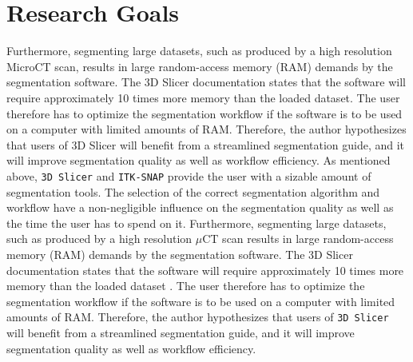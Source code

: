 \section{Research Goals}
\label{s:introduction-researchgoals}
Furthermore, segmenting large datasets, such as produced by a high resolution MicroCT scan, results in large random-access memory (RAM) demands by the segmentation software.
The 3D Slicer documentation states that the software will require approximately 10 times more memory than the loaded dataset.
The user therefore has to optimize the segmentation workflow if the software is to be used on a computer with limited amounts of RAM.
Therefore, the author hypothesizes that users of 3D Slicer will benefit from a streamlined segmentation guide, and it will improve segmentation quality as well as workflow efficiency.
As mentioned above, \texttt{3D Slicer} and \texttt{ITK-SNAP} provide the user with a sizable amount of segmentation tools. The selection of the correct segmentation algorithm and workflow have a non-negligible influence on the segmentation quality as well as the time the user has to spend on it\cite{liuSAMMSegmentAny2023}. Furthermore, segmenting large datasets, such as produced by a high resolution $\mu$CT scan results in large random-access memory (RAM) demands by the segmentation software\cite{smistadMedicalImageSegmentation2015}.
The 3D Slicer documentation states that the software will require approximately 10 times more memory than the loaded dataset \cite{slicercommunity3DSlicerImage2022,fedorov3DSlicerImage2012}.
The user therefore has to optimize the segmentation workflow if the software is to be used on a computer with limited amounts of RAM.
Therefore, the author hypothesizes that users of \texttt{3D Slicer} will benefit from a streamlined segmentation guide, and it will improve segmentation quality as well as workflow efficiency.




